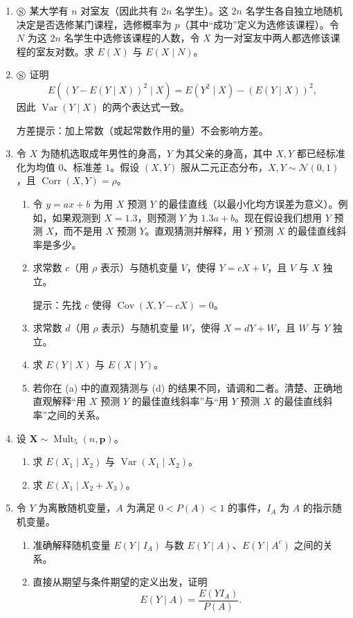 \documentclass[UTF8,12pt,a4paper,fontset=fandol]{ctexart}
\begin{document}
\begin{enumerate}
  \item $\circledS$ 某大学有 $n$ 对室友（因此共有 $2n$ 名学生）。这 $2n$ 名学生各自独立地随机决定是否选修某门课程，选修概率为 $p$（其中“成功”定义为选修该课程）。令 $N$ 为这 $2n$ 名学生中选修该课程的人数，令 $X$ 为一对室友中两人都选修该课程的室友对数。求 $E(X)$ 与 $E(X\mid N)$。

  \item $\circledS$ 证明
  \[
    E((Y-E(Y\mid X))^2\mid X)=E(Y^2\mid X)-(E(Y\mid X))^2,
  \]
  因此 $\operatorname{Var}(Y\mid X)$ 的两个表达式一致。

  \noindent 方差提示：加上常数（或起常数作用的量）不会影响方差。

  \item 令 $X$ 为随机选取成年男性的身高，$Y$ 为其父亲的身高，其中 $X,Y$ 都已经标准化为均值 $0$、标准差 $1$。假设 $(X,Y)$ 服从二元正态分布，$X,Y\sim\mathcal N(0,1)$，且 $\operatorname{Corr}(X,Y)=\rho$。
  \begin{enumerate}
    \item[(a)] 令 $y=ax+b$ 为用 $X$ 预测 $Y$ 的最佳直线（以最小化均方误差为意义）。例如，如果观测到 $X=1.3$，则预测 $Y$ 为 $1.3a+b$。现在假设我们想用 $Y$ 预测 $X$，而不是用 $X$ 预测 $Y$。直观猜测并解释，用 $Y$ 预测 $X$ 的最佳直线斜率是多少。
    \item[(b)] 求常数 $c$（用 $\rho$ 表示）与随机变量 $V$，使得 $Y=cX+V$，且 $V$ 与 $X$ 独立。

    \noindent 提示：先找 $c$ 使得 $\operatorname{Cov}(X,Y-cX)=0$。

    \item[(c)] 求常数 $d$（用 $\rho$ 表示）与随机变量 $W$，使得 $X=dY+W$，且 $W$ 与 $Y$ 独立。
    \item[(d)] 求 $E(Y\mid X)$ 与 $E(X\mid Y)$。
    \item[(e)] 若你在 (a) 中的直观猜测与 (d) 的结果不同，请调和二者。清楚、正确地直观解释“用 $X$ 预测 $Y$ 的最佳直线斜率”与“用 $Y$ 预测 $X$ 的最佳直线斜率”之间的关系。
  \end{enumerate}

  \item 设 $\mathbf X\sim\operatorname{Mult}_5(n,\mathbf p)$。
  \begin{enumerate}
    \item[(a)] 求 $E(X_1\mid X_2)$ 与 $\operatorname{Var}(X_1\mid X_2)$。
    \item[(b)] 求 $E(X_1\mid X_2+X_3)$。
  \end{enumerate}

  \item 令 $Y$ 为离散随机变量，$A$ 为满足 $0<P(A)<1$ 的事件，$I_A$ 为 $A$ 的指示随机变量。
  \begin{enumerate}
    \item[(a)] 准确解释随机变量 $E(Y\mid I_A)$ 与数 $E(Y\mid A)$、$E(Y\mid A^c)$ 之间的关系。
    \item[(b)] 直接从期望与条件期望的定义出发，证明
    \[
      E(Y\mid A)=\frac{E(YI_A)}{P(A)}.
    \]


\end{enumerate}
\end{enumerate}
\end{document}
